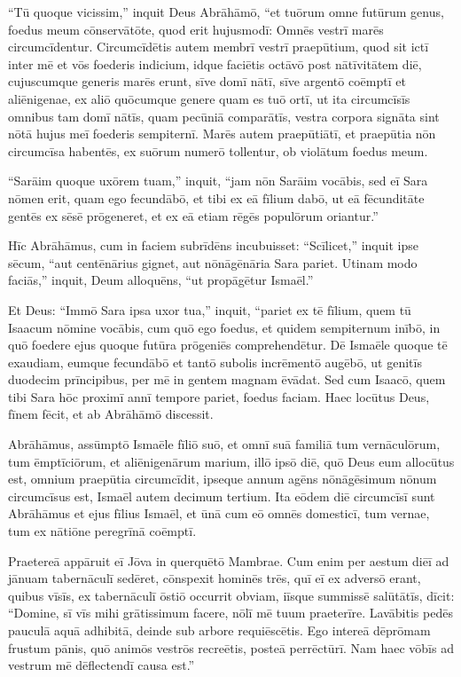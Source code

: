 \Versus ``Tū quoque vicissim,'' inquit Deus Abrāhāmō, ``et tuōrum omne futūrum genus, foedus meum cōnservātōte,
\Versus quod erit hujusmodī: Omnēs vestrī marēs circumcīdentur.
\Versus Circumcīdētis autem membrī vestrī praepūtium, quod sit ictī inter mē et vōs foederis indicium,
\Versus idque faciētis octāvō post nātīvitātem diē, cujuscumque generis marēs erunt, sīve domī nātī, sīve argentō coēmptī et aliēnigenae, ex aliō quōcumque genere quam es tuō ortī,
\Versus ut ita circumcīsīs omnibus tam domī nātīs, quam pecūniā comparātīs, vestra corpora signāta sint nōtā hujus meī foederis sempiternī.
\Versus  Marēs autem praepūtiātī, et praepūtia nōn circumcīsa habentēs, ex suōrum numerō tollentur, ob violātum foedus meum.

\Versus ``Sarāim quoque uxōrem tuam,'' inquit, ``jam nōn Sarāim vocābis, sed eī Sara nōmen erit,
\Versus quam ego fecundābō, et tibi ex eā fīlium dabō, ut eā fēcunditāte gentēs ex sēsē prōgeneret, et ex eā etiam rēgēs populōrum oriantur.''

\Versus Hīc Abrāhāmus, cum in faciem subrīdēns incubuisset: ``Scīlicet,'' inquit ipse sēcum, ``aut centēnārius gignet, aut nōnāgēnāria Sara pariet.
\Versus Utinam modo faciās,'' inquit, Deum alloquēns, ``ut propāgētur Ismaēl.''

\Versus Et Deus: ``Immō Sara ipsa uxor tua,'' inquit, ``pariet ex tē fīlium, quem tū Isaacum nōmine vocābis, cum quō ego foedus, et quidem sempiternum inībō, in quō foedere ejus quoque futūra prōgeniēs comprehendētur.
\Versus Dē Ismaēle quoque tē exaudiam, eumque fecundābō et tantō subolis incrēmentō augēbō, ut genitīs duodecim prīncipibus, per mē in gentem magnam ēvādat.
\Versus Sed cum Isaacō, quem tibi Sara hōc proximī annī tempore pariet, foedus faciam. 
\Versus Haec locūtus Deus, fīnem fēcit, et ab Abrāhāmō discessit.

\Versus Abrāhāmus, assūmptō Ismaēle fīliō suō, et omnī suā familiā tum vernāculōrum, tum ēmptīciōrum, et aliēnigenārum marium, illō ipsō diē, quō Deus eum allocūtus est, omnium praepūtia circumcīdit,
\Versus ipseque annum agēns nōnāgēsimum nōnum circumcīsus est,
\Versus Ismaēl autem decimum tertium.
\Versus Ita eōdem diē circumcīsī sunt Abrāhāmus et ejus fīlius Ismaēl,
\Versus et ūnā cum eō omnēs domesticī, tum vernae, tum ex nātiōne peregrīnā coēmptī.



\Caput
\Versus Praetereā appāruit eī Jōva in querquētō Mambrae. Cum enim per aestum diēī ad jānuam tabernāculī sedēret,
\Versus cōnspexit hominēs trēs, quī eī ex adversō erant, quibus vīsīs, ex tabernāculī ōstiō occurrit obviam, iīsque summissē salūtātīs, dīcit:
\Versus ``Domine, sī vīs mihi grātissimum facere, nōlī mē tuum praeterīre.
\Versus Lavābitis pedēs pauculā aquā adhibitā, deinde sub arbore requiēscētis.
\Versus Ego intereā dēprōmam frustum pānis, quō animōs vestrōs recreētis, posteā perrēctūrī. Nam haec vōbīs ad vestrum mē dēflectendī causa est.''

